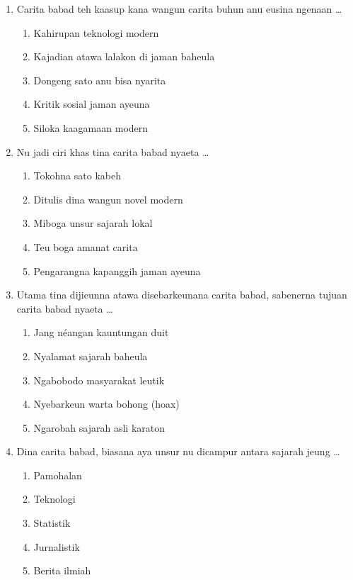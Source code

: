 \documentclass[12pt,a4paper]{article}
\begin{document}
\begin{enumerate}[leftmargin=*]
\item Carita babad teh kaasup kana wangun carita buhun anu eusina ngenaan \dots
    \begin{enumerate}[label=\alph*.]
        \item Kahirupan teknologi modern
        \item Kajadian atawa lalakon di jaman baheula
        \item Dongeng sato anu bisa nyarita
        \item Kritik sosial jaman ayeuna
        \item Siloka kaagamaan modern
    \end{enumerate}

\item Nu jadi ciri khas tina carita babad nyaeta \dots
    \begin{enumerate}[label=\alph*.]
        \item Tokohna sato kabeh
        \item Ditulis dina wangun novel modern
        \item Miboga unsur sajarah lokal
        \item Teu boga amanat carita
        \item Pengarangna kapanggih jaman ayeuna
    \end{enumerate}

\item Utama tina dijieunna atawa disebarkeunana carita babad, sabenerna tujuan carita babad nyaeta \dots
    \begin{enumerate}[label=\alph*.]
        \item Jang néangan kauntungan duit
        \item Nyalamat sajarah baheula
        \item Ngabobodo masyarakat leutik
        \item Nyebarkeun warta bohong (hoax)
        \item Ngarobah sajarah asli karaton
    \end{enumerate}

\item Dina carita babad, biasana aya unsur nu dicampur antara sajarah jeung \dots
    \begin{enumerate}[label=\alph*.]
        \item Pamohalan
        \item Teknologi
        \item Statistik
        \item Jurnalistik
        \item Berita ilmiah
    \end{enumerate}


\end{enumerate}
\end{document}
